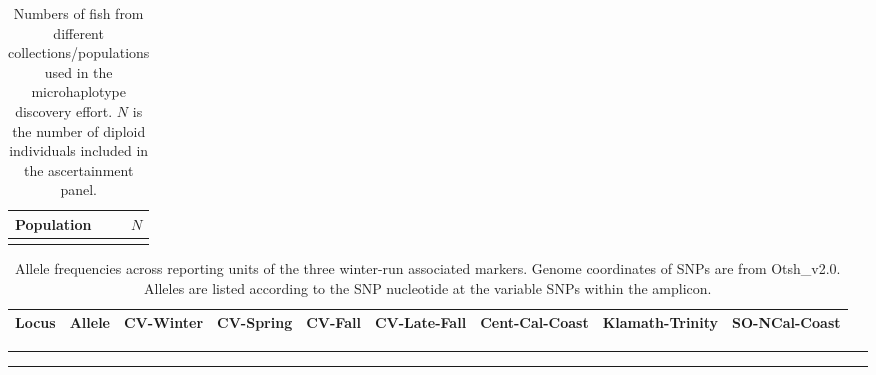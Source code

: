 

\begin{table}
\caption[Microhaplotype discovery panel sample sizes]{Numbers of fish from different collections/populations used in the microhaplotype discovery effort.
$N$ is the number of diploid individuals included in the ascertainment panel.}
\label{tab:ascert-panel}
\begin{center}
{\footnotesize
\begin{tabular}{lr}
\hline\hline
Population&$N$ \\ \hline

\\ \hline\hline
\end{tabular}
}
\end{center}
\end{table}

\begin{table}
\caption[Allele frequencies of winter-run-associated polymorphisms]{Allele frequencies across reporting units of the three winter-run associated
markers. Genome coordinates of SNPs are from Otsh\_v2.0. Alleles are listed according to the SNP nucleotide
at the variable SNPs within the amplicon.}
\label{tab:wrap-freqs}
{\footnotesize
\begin{tabular*}{\columnwidth}{@{\extracolsep{\fill}} lrrrrrrrr}
\hline\hline
Locus&Allele&CV-Winter&CV-Spring&CV-Fall&CV-Late-Fall&Cent-Cal-Coast&Klamath-Trinity&SO-NCal-Coast \\ \hline

\end{tabular*}
}
\vspace*{-2.3ex}\hrule\vspace*{0.3ex}\hrule
\end{table}

